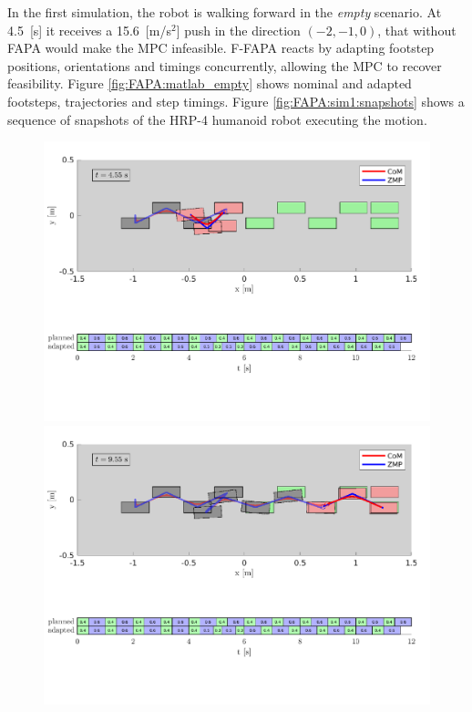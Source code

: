 In the first simulation, the robot is walking forward in the {\em empty}
scenario. At 4.5~[s] it receives a 15.6~[m/s$^2]$ push in the direction $(-2, -1, 0)$,
that without FAPA would make the MPC infeasible. F-FAPA reacts by adapting
footstep positions, orientations and timings concurrently, allowing the MPC
to recover feasibility. Figure \ref{fig:FAPA:matlab_empty} shows nominal and
adapted footsteps, trajectories and step timings.
Figure \ref{fig:FAPA:sim1:snapshots} shows a sequence of snapshots of the
HRP-4 humanoid robot executing the motion.
\begin{figure}
    \centering
    \includegraphics[trim={0 5.9cm 0 0.7cm},clip,width=\textwidth]{figures/empty-fixed-plot-after-push.pdf}
    \includegraphics[trim={0 5.9cm 0 0.7cm},clip,width=\textwidth]{figures/empty-fixed-plot-completing-task.pdf}

\end{figure}
